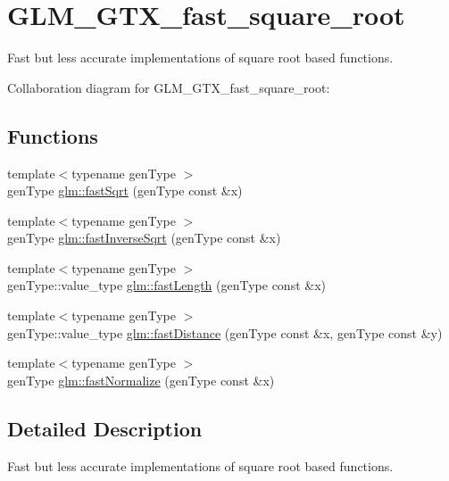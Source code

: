 \hypertarget{group__gtx__fast__square__root}{}\section{G\+L\+M\+\_\+\+G\+T\+X\+\_\+fast\+\_\+square\+\_\+root}
\label{group__gtx__fast__square__root}


Fast but less accurate implementations of square root based functions.  


Collaboration diagram for G\+L\+M\+\_\+\+G\+T\+X\+\_\+fast\+\_\+square\+\_\+root\+:
\subsection*{Functions}
\begin{DoxyCompactItemize}
\item 
{\footnotesize template$<$typename gen\+Type $>$ }\\gen\+Type \hyperlink{group__gtx__fast__square__root_gad57c343d2362c1469043adedeb8ef8eb}{glm\+::fast\+Sqrt} (gen\+Type const \&x)
\item 
{\footnotesize template$<$typename gen\+Type $>$ }\\gen\+Type \hyperlink{group__gtx__fast__square__root_ga49dd9caa2853398474e5aae377259a22}{glm\+::fast\+Inverse\+Sqrt} (gen\+Type const \&x)
\item 
{\footnotesize template$<$typename gen\+Type $>$ }\\gen\+Type\+::value\+\_\+type \hyperlink{group__gtx__fast__square__root_ga2e726cc8b9f02b7c09910858ea1afac6}{glm\+::fast\+Length} (gen\+Type const \&x)
\item 
{\footnotesize template$<$typename gen\+Type $>$ }\\gen\+Type\+::value\+\_\+type \hyperlink{group__gtx__fast__square__root_ga646eee2633e9de7274de9bc6f5af92b5}{glm\+::fast\+Distance} (gen\+Type const \&x, gen\+Type const \&y)
\item 
{\footnotesize template$<$typename gen\+Type $>$ }\\gen\+Type \hyperlink{group__gtx__fast__square__root_ga2953e7426a420bb2b33affce7360ef40}{glm\+::fast\+Normalize} (gen\+Type const \&x)
\end{DoxyCompactItemize}


\subsection{Detailed Description}
Fast but less accurate implementations of square root based functions. 


